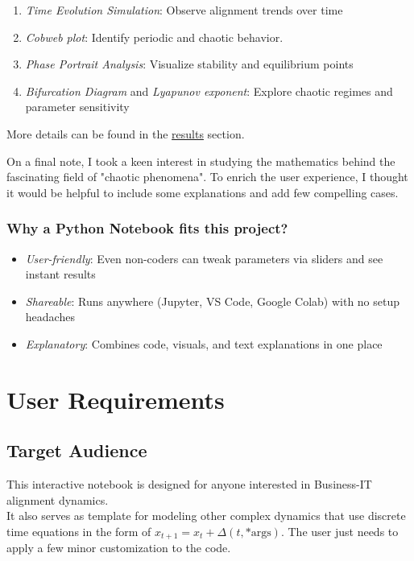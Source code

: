 \documentclass[a4paper, 10pt]{article}
\begin{document}
\begin{enumerate}
    \item \textit{Time Evolution Simulation}: Observe alignment trends over time
    \item \textit{Cobweb plot}: Identify periodic and chaotic behavior.
    \item \textit{Phase Portrait Analysis}: Visualize stability and equilibrium points
    \item \textit{Bifurcation Diagram} and \textit{Lyapunov exponent}: Explore chaotic regimes and parameter sensitivity
\end{enumerate}

More details can be found in the \hyperref[sec:results]{results} section.

On a final note, I took a keen interest in studying the mathematics behind the fascinating field of "chaotic phenomena". 
To enrich the user experience, I thought it would be helpful to include some explanations and add few compelling cases.

\subsubsection*{Why a Python Notebook fits this project?}

\begin{itemize}
    \item \textit{User-friendly}: Even non-coders can tweak parameters via sliders and see instant results
    \item \textit{Shareable}: Runs anywhere (Jupyter, VS Code, Google Colab) with no setup headaches
    \item \textit{Explanatory}: Combines code, visuals, and text explanations in one place
\end{itemize}

\section{User Requirements}
\subsection{Target Audience}
This interactive notebook is designed for anyone interested in Business-IT alignment dynamics. \\
It also serves as template for modeling other complex dynamics that use discrete time equations in the form of $x_{t+1} = x_t + \Delta(t, \text{*args})$. The user just needs to apply a few minor customization to the code.
\end{document}
